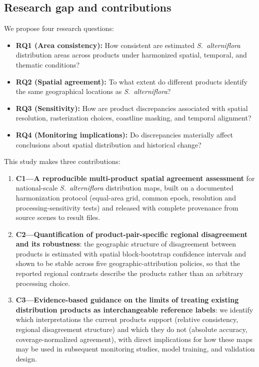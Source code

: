 \documentclass[11pt]{article}
\begin{document}
\subsection{Research gap and contributions}

We propose four research questions:

\begin{itemize}[nosep]
\item \textbf{RQ1 (Area consistency):} How consistent are estimated
  \textit{S.~alterniflora} distribution areas across products under harmonized
  spatial, temporal, and thematic conditions?
\item \textbf{RQ2 (Spatial agreement):} To what extent do different products
  identify the same geographical locations as \textit{S.~alterniflora}?
\item \textbf{RQ3 (Sensitivity):} How are product discrepancies associated with
  spatial resolution, rasterization choices, coastline masking, and temporal
  alignment?
\item \textbf{RQ4 (Monitoring implications):} Do discrepancies materially affect
  conclusions about spatial distribution and historical change?
\end{itemize}

This study makes three contributions:

\begin{enumerate}[nosep]
\item \textbf{C1---A reproducible multi-product spatial agreement assessment}
  for national-scale \textit{S.~alterniflora} distribution maps, built on a
  documented harmonization protocol (equal-area grid, common epoch,
  resolution and processing-sensitivity tests) and released with complete
  provenance from source scenes to result files.
\item \textbf{C2---Quantification of product-pair-specific regional
  disagreement and its robustness}: the geographic structure of disagreement
  between products is estimated with spatial block-bootstrap confidence
  intervals and shown to be stable across five geographic-attribution
  policies, so that the reported regional contrasts describe the products
  rather than an arbitrary processing choice.
\item \textbf{C3---Evidence-based guidance on the limits of treating existing
  distribution products as interchangeable reference labels}: we identify
  which interpretations the current products support (relative consistency,
  regional disagreement structure) and which they do not (absolute accuracy,
  coverage-normalized agreement), with direct implications for how these
  maps may be used in subsequent monitoring studies, model training, and
  validation design.
\end{enumerate}
\end{document}
